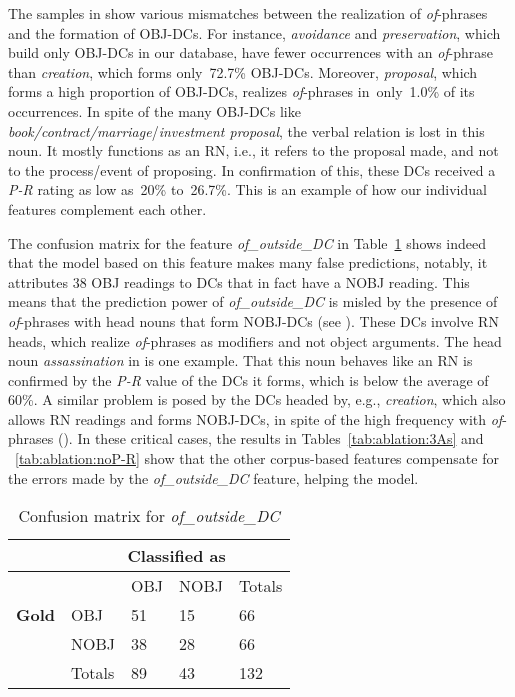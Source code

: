 \documentclass[output=paper]{langsci/langscibook}
\begin{document}
The samples  in  show various mismatches between the realization of \textit{of}-phrases and the formation of OBJ-DCs. For instance, \textit{avoidance} and \textit{preservation}, which build only OBJ-DCs in our database, have fewer occurrences with an \textit{of}-phrase than \textit{creation}, which forms only~72.7\% OBJ-DCs. Moreover, \textit{proposal}, which forms a high proportion of OBJ-DCs, realizes \textit{of}-phrases  in~only~1.0\% of its occurrences. In spite of the many OBJ-DCs like  \textit{book/contract/marriage}/\textit{investment proposal}, the verbal relation is lost in this noun. It mostly functions as an RN, i.e., it refers to the proposal made, and not to the process/event of proposing. In confirmation of this, these DCs received a \textit{P-R} rating as low as~20\% to~26.7\%.
This is an example of how our individual features complement each other. 

The confusion matrix for the feature \textit{of\_outside\_DC} in Table~\ref{tab:conf:of-outside} shows indeed that the model based on this feature makes many false predictions, notably, it attributes 38 OBJ readings to DCs that in fact have a NOBJ reading. This means that the prediction power of \textit{of\_outside\_DC} is misled by the presence of \textit{of}-phrases with head nouns that form NOBJ-DCs (see ). These DCs involve RN heads, which realize \textit{of}-phrases as modifiers and not object arguments. The head noun \textit{assassination} in  is one example. That this noun behaves like an RN is confirmed by the \textit{P-R} value of the DCs it forms, which is below the average of 60\%. A similar problem is posed by the DCs headed by, e.g., \textit{creation}, which also allows RN readings and forms NOBJ-DCs, in spite of the high frequency with \textit{of}-phrases (). In these critical cases, the results in Tables~\ref{tab:ablation:3As} and ~\ref{tab:ablation:noP-R} show that the other corpus-based features compensate for the errors made by the \textit{of\_outside\_DC} feature, helping the model.


\begin{table}
\caption{\label{tab:conf:of-outside}Confusion matrix for \textit{of\_outside\_DC}}
{\footnotesize
\begin{tabular}{|l|l|l|l|l|}
\hline
&\multicolumn{4}{c|}{\textbf{Classified as}}\\
\hline
&&  OBJ&NOBJ&Totals \\   
\textbf{Gold} & OBJ &51 &15&66 \\
& NOBJ&38 & 28&66  \\\hline
&Totals&89 &43&132\\
\hline
\end{tabular}}
\end{table}
\end{document}
